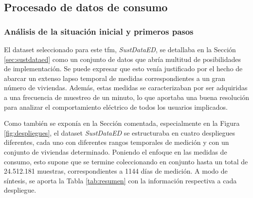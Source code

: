 \subsection{Procesado de datos de consumo}

\subsubsection{Análisis de la situación inicial y primeros pasos}
\label{sec:inicialproc}

El dataset seleccionado para este \gls{tfm}, \textit{SustDataED}, se detallaba en la Sección \ref{sec:sustdataed} como un conjunto de datos que abría multitud de posibilidades de implementación. Se puede expresar que esto venía justificado por el hecho de abarcar un extenso lapso temporal de medidas correspondientes a un gran número de viviendas. Además, estas medidas se caracterizaban por ser adquiridas a una frecuencia de muestreo de un minuto, lo que aportaba una buena resolución para analizar el comportamiento eléctrico de todos los usuarios implicados. 

\vspace{3mm}

Como también se exponía en la Sección comentada, especialmente en la Figura \ref{fig:despliegues}, el dataset \textit{SustDataED} se estructuraba en cuatro despliegues diferentes, cada uno con diferentes rangos temporales de medición y con un conjunto de viviendas determinado. Poniendo el enfoque en las medidas de consumo, esto supone que se termine coleccionando en conjunto hasta un total de 24.512.181 muestras, correspondientes a 1144 días de medición. A modo de síntesis, se aporta la Tabla \ref{tab:resumen} con la información respectiva a cada despliegue. \cite{sustdata}

\vspace{3mm}

